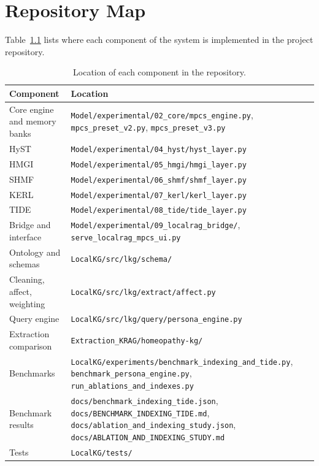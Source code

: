 \documentclass[12pt,a4paper,oneside]{report}
\newcommand{\code}[1]{\texttt{\small #1}}
\begin{document}
\appendix
{}
\chapter{Repository Map}\label{app:repo}
Table~\ref{tab:repo} lists where each component of the system is implemented in the project repository.

\begin{table}[H]
\centering
\caption{Location of each component in the repository.}
\label{tab:repo}
\small
\begin{tabularx}{\linewidth}{@{}l X@{}}
\toprule
Component & Location\\
\midrule
Core engine and memory banks & \code{Model/experimental/02\_core/mpcs\_engine.py}, \code{mpcs\_preset\_v2.py}, \code{mpcs\_preset\_v3.py}\\
HyST & \code{Model/experimental/04\_hyst/hyst\_layer.py}\\
HMGI & \code{Model/experimental/05\_hmgi/hmgi\_layer.py}\\
SHMF & \code{Model/experimental/06\_shmf/shmf\_layer.py}\\
KERL & \code{Model/experimental/07\_kerl/kerl\_layer.py}\\
TIDE & \code{Model/experimental/08\_tide/tide\_layer.py}\\
Bridge and interface & \code{Model/experimental/09\_localrag\_bridge/}, \code{serve\_localrag\_mpcs\_ui.py}\\
Ontology and schemas & \code{LocalKG/src/lkg/schema/}\\
Cleaning, affect, weighting & \code{LocalKG/src/lkg/extract/affect.py}\\
Query engine & \code{LocalKG/src/lkg/query/persona\_engine.py}\\
Extraction comparison & \code{Extraction\_KRAG/homeopathy-kg/}\\
Benchmarks & \code{LocalKG/experiments/benchmark\_indexing\_and\_tide.py}, \code{benchmark\_persona\_engine.py}, \code{run\_ablations\_and\_indexes.py}\\
Benchmark results & \code{docs/benchmark\_indexing\_tide.json}, \code{docs/BENCHMARK\_INDEXING\_TIDE.md}, \code{docs/ablation\_and\_indexing\_study.json}, \code{docs/ABLATION\_AND\_INDEXING\_STUDY.md}\\
Tests & \code{LocalKG/tests/}\\
\bottomrule
\end{tabularx}
\end{table}
\end{document}
